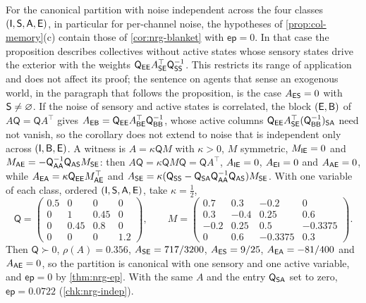 \begin{remark}\label{rem:nrg-memory-scope}
For the canonical partition with noise independent across the four classes $(\mathsf{I},\mathsf{S},\mathsf{A},\mathsf{E})$, in particular for per-channel noise, the hypotheses of \cref{prop:col-memory}(c) contain those of \cref{cor:nrg-blanket} with $\mathsf{ep}=0$. In that case the proposition describes collectives without active states whose sensory states drive the exterior with the weights $\mathsf Q_{\mathsf{E}\mathsf{E}}A_{\mathsf{S}\mathsf{E}}^\top\mathsf Q_{\mathsf{S}\mathsf{S}}^{-1}$. This restricts its range of application and does not affect its proof; the sentence on agents that sense an exogenous world, in the paragraph that follows the proposition, is the case $A_{\mathsf{E}\mathsf{S}}=0$ with $\mathsf{S}\neq\varnothing$. If the noise of sensory and active states is correlated, the block $(\mathsf{E},\mathsf{B})$ of $A\mathsf Q=\mathsf QA^\top$ gives $A_{\mathsf{E}\mathsf{B}}=\mathsf Q_{\mathsf{E}\mathsf{E}}A_{\mathsf{B}\mathsf{E}}^\top\mathsf Q_{\mathsf{B}\mathsf{B}}^{-1}$, whose active columns $\mathsf Q_{\mathsf{E}\mathsf{E}}A_{\mathsf{S}\mathsf{E}}^\top(\mathsf Q_{\mathsf{B}\mathsf{B}}^{-1})_{\mathsf{S}\mathsf{A}}$ need not vanish, so the corollary does not extend to noise that is independent only across $(\mathsf{I},\mathsf{B},\mathsf{E})$. A witness is $A=\kappa\mathsf QM$ with $\kappa>0$, $M$ symmetric, $M_{\mathsf{I}\mathsf{E}}=0$ and $M_{\mathsf{A}\mathsf{E}}=-\mathsf Q_{\mathsf{A}\mathsf{A}}^{-1}\mathsf Q_{\mathsf{A}\mathsf{S}}M_{\mathsf{S}\mathsf{E}}$: then $A\mathsf Q=\kappa\mathsf QM\mathsf Q=\mathsf QA^\top$, $A_{\mathsf{I}\mathsf{E}}=0$, $A_{\mathsf{E}\mathsf{I}}=0$ and $A_{\mathsf{A}\mathsf{E}}=0$, while $A_{\mathsf{E}\mathsf{A}}=\kappa\mathsf Q_{\mathsf{E}\mathsf{E}}M_{\mathsf{A}\mathsf{E}}^\top$ and $A_{\mathsf{S}\mathsf{E}}=\kappa(\mathsf Q_{\mathsf{S}\mathsf{S}}-\mathsf Q_{\mathsf{S}\mathsf{A}}\mathsf Q_{\mathsf{A}\mathsf{A}}^{-1}\mathsf Q_{\mathsf{A}\mathsf{S}})M_{\mathsf{S}\mathsf{E}}$. With one variable of each class, ordered $(\mathsf{I},\mathsf{S},\mathsf{A},\mathsf{E})$, take $\kappa=\tfrac12$,
\[
\mathsf Q=\begin{pmatrix}0.5&0&0&0\\0&1&0.45&0\\0&0.45&0.8&0\\0&0&0&1.2\end{pmatrix},\qquad
M=\begin{pmatrix}0.7&0.3&-0.2&0\\0.3&-0.4&0.25&0.6\\-0.2&0.25&0.5&-0.3375\\0&0.6&-0.3375&0.3\end{pmatrix}.
\]
Then $\mathsf Q\succ0$, $\rho(A)=0.356$, $A_{\mathsf{S}\mathsf{E}}=717/3200$, $A_{\mathsf{E}\mathsf{S}}=9/25$, $A_{\mathsf{E}\mathsf{A}}=-81/400$ and $A_{\mathsf{A}\mathsf{E}}=0$, so the partition is canonical with one sensory and one active variable, and $\mathsf{ep}=0$ by \cref{thm:nrg-ep}. With the same $A$ and the entry $\mathsf Q_{\mathsf{S}\mathsf{A}}$ set to zero, $\mathsf{ep}=0.0722$ (\cref{chk:nrg-indep}).
\end{remark}

